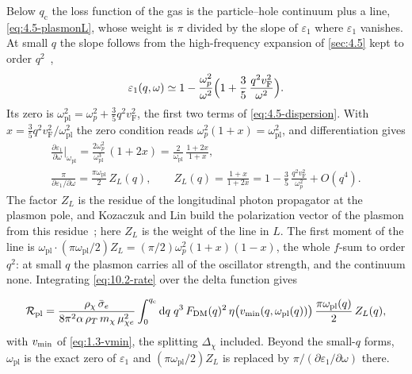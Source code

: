 Below $q_{\mathrm{c}}$ the loss function of the gas is the particle--hole continuum plus a line, \cref{eq:4.5-plasmonL}, whose weight is $\pi$ divided by the slope of $\varepsilon_1$ where $\varepsilon_1$ vanishes. At small $q$ the slope follows from the high-frequency expansion of \cref{sec:4.5} kept to order $q^2$~\cite[Eq.~(5)]{kozaczuk2020plasmon},
\begin{equation*}
  \varepsilon_1(q,\omega) \simeq 1 - \frac{\omega_p^2}{\omega^2}\Bigl(1 + \frac{3}{5}\,\frac{q^2v_{\mathrm{F}}^2}{\omega^2}\Bigr) .
\end{equation*}
Its zero is $\omega_{\mathrm{pl}}^2 = \omega_p^2 + \tfrac35q^2v_{\mathrm{F}}^2$, the first two terms of \cref{eq:4.5-dispersion}. With $x = \tfrac35q^2v_{\mathrm{F}}^2/\omega_{\mathrm{pl}}^2$ the zero condition reads $\omega_p^2(1 + x) = \omega_{\mathrm{pl}}^2$, and differentiation gives
\begin{gather*}
  \frac{\partial\varepsilon_1}{\partial\omega}\bigg|_{\omega_{\mathrm{pl}}} = \frac{2\omega_p^2}{\omega_{\mathrm{pl}}^3}\,(1 + 2x) = \frac{2}{\omega_{\mathrm{pl}}}\,\frac{1 + 2x}{1 + x} , \\
  \frac{\pi}{\partial\varepsilon_1/\partial\omega} = \frac{\pi\omega_{\mathrm{pl}}}{2}\,Z_L(q) , \qquad Z_L(q) = \frac{1 + x}{1 + 2x} = 1 - \frac35\,\frac{q^2v_{\mathrm{F}}^2}{\omega_p^2} + O(q^4) .
\end{gather*}
The factor $Z_L$ is the residue of the longitudinal photon propagator at the plasmon pole, and Kozaczuk and Lin build the polarization vector of the plasmon from this residue~\cite[Eq.~(7)]{kozaczuk2020plasmon}; here $Z_L$ is the weight of the line in $L$. The first moment of the line is $\omega_{\mathrm{pl}}\cdot(\pi\omega_{\mathrm{pl}}/2)Z_L = (\pi/2)\omega_p^2(1 + x)(1 - x)$, the whole $f$-sum to order $q^2$: at small $q$ the plasmon carries all of the oscillator strength, and the continuum none. Integrating \cref{eq:10.2-rate} over the delta function gives
\begin{keyresult}
\begin{equation}
  \mathcal{R}_{\mathrm{pl}} = \frac{\rho_\chi\,\bar{\sigma}_{e}}{8\pi^2\alpha\,\rho_T\,m_{\chi}\,\mu_{\chi e}^2}\int_0^{q_{\mathrm{c}}}\mathrm{d} q\;q^3\,F_{\mathrm{DM}}(q)^2\,\eta\bigl(v_{\mathrm{min}}(q,\omega_{\mathrm{pl}}(q))\bigr)\,\frac{\pi\omega_{\mathrm{pl}}(q)}{2}\,Z_L(q) ,
  \label{eq:10.3-plrate}
\end{equation}
with $v_{\mathrm{min}}$ of \cref{eq:1.3-vmin}, the splitting $\Delta_\chi$ included. Beyond the small-$q$ forms, $\omega_{\mathrm{pl}}$ is the exact zero of $\varepsilon_1$ and $(\pi\omega_{\mathrm{pl}}/2)Z_L$ is replaced by $\pi/(\partial\varepsilon_1/\partial\omega)$ there.
\end{keyresult}
